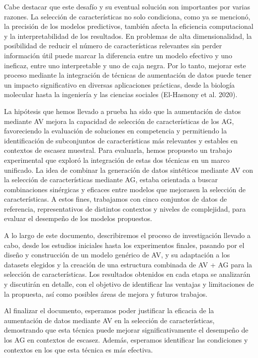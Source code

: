 Cabe destacar que este desafío y su eventual solución son importantes por varias razones. La selección de características no solo condiciona, como ya se mencionó, la precisión de los modelos predictivos, también afecta la eficiencia computacional y la interpretabilidad de los resultados. En problemas de alta dimensionalidad, la posibilidad de reducir el número de características relevantes sin perder información útil puede marcar la diferencia entre un modelo efectivo y uno ineficaz, entre uno interpretable y uno de caja negra. Por lo tanto, mejorar este proceso mediante la integración de técnicas de aumentación de datos puede tener un impacto significativo en diversas aplicaciones prácticas, desde la biología molecular hasta la ingeniería y las ciencias sociales (El-Hasnony et al. 2020).

La hipótesis que hemos llevado a prueba ha sido que la aumentación de datos mediante AV mejora la capacidad de selección de características de los AG, favoreciendo la evaluación de soluciones en competencia y permitiendo la identificación de subconjuntos de características más relevantes y estables en contextos de escasez muestral. Para evaluarla, hemos propuesto un trabajo experimental que exploró la integración de estas dos técnicas en un marco unificado. La idea de combinar la generación de datos sintéticos mediante AV con la selección de características mediante AG, estaba orientada a buscar combinaciones sinérgicas y eficaces entre modelos que mejorasen la selección de características. A estos fines, trabajamos con cinco conjuntos de datos de referencia, representativos de distintos contextos y niveles de complejidad, para evaluar el desempeño de los modelos propuestos.

A lo largo de este documento, describiremos el proceso de investigación llevado a cabo, desde los estudios iniciales hasta los experimentos finales, pasando por el diseño y construcción de un modelo genérico de AV, y su adaptación a los datasets elegidos y la creación de una estructura combinada de AV + AG para la selección de características. Los resultados obtenidos en cada etapa se analizarán y discutirán en detalle, con el objetivo de identificar las ventajas y limitaciones de la propuesta, así como posibles áreas de mejora y futuros trabajos.

Al finalizar el documento, esperamos poder justificar la eficacia de la aumentación de datos mediante AV en la selección de características, demostrando que esta técnica puede mejorar significativamente el desempeño de los AG en contextos de escasez. Además, esperamos identificar las condiciones y contextos en los que esta técnica es más efectiva.

